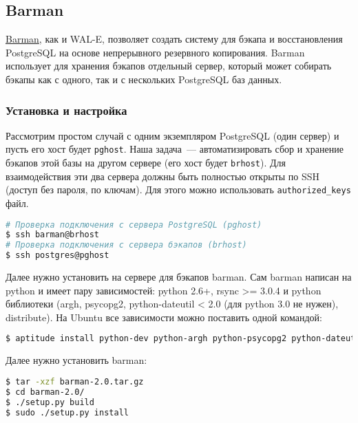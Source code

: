 \subsection{Barman}

\href{http://www.pgbarman.org/}{Barman}, как и WAL-E, позволяет создать систему для бэкапа и восстановления PostgreSQL на основе непрерывного резервного копирования. Barman использует для хранения бэкапов отдельный сервер, который может собирать бэкапы как с одного, так и с нескольких PostgreSQL баз данных.

\subsubsection{Установка и настройка}

Рассмотрим простом случай с одним экземпляром PostgreSQL (один сервер) и пусть его хост будет \lstinline!pghost!. Наша задача~--- автоматизировать сбор и хранение бэкапов этой базы на другом сервере (его хост будет \lstinline!brhost!). Для взаимодействия эти два сервера должны быть полностью открыты по SSH (доступ без пароля, по ключам). Для этого можно использовать \lstinline!authorized_keys! файл.

\begin{lstlisting}[language=Bash,label=lst:barman1,caption=Проверка подключения по SSH]
# Проверка подключения с сервера PostgreSQL (pghost)
$ ssh barman@brhost
# Проверка подключения с сервера бэкапов (brhost)
$ ssh postgres@pghost
\end{lstlisting}

Далее нужно установить на сервере для бэкапов barman. Сам barman написан на python и имеет пару зависимостей: python 2.6+, rsync >= 3.0.4 и python библиотеки (argh, psycopg2, python-dateutil < 2.0 (для python 3.0 не нужен), distribute). На Ubuntu все зависимости можно поставить одной командой:

\begin{lstlisting}[language=Bash,label=lst:barman2,caption=Установка зависимостей barman]
$ aptitude install python-dev python-argh python-psycopg2 python-dateutil rsync python-setuptools
\end{lstlisting}

Далее нужно установить barman:

\begin{lstlisting}[language=Bash,label=lst:barman3,caption=Установка barman]
$ tar -xzf barman-2.0.tar.gz
$ cd barman-2.0/
$ ./setup.py build
$ sudo ./setup.py install
\end{lstlisting}

